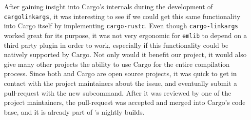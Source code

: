 After gaining insight into Cargo's internals during the development of \texttt{cargo\-linkargs}, it was interesting to see if we could get this same functionality into Cargo itself by implementing \texttt{cargo-rustc}.
Even though \texttt{cargo-linkargs} worked great for its purpose, it was not very ergonomic for \texttt{emlib} to depend on a third party plugin in order to work, especially if this functionality could be natively supported by Cargo.
Not only would it benefit our project, it would also give many other \rust projects the ability to use Cargo for the entire compilation process.
Since both \rust and Cargo are open source projects, it was quick to get in contact with the project maintainers about the issue, and eventually submit a pull-request with the new subcommand.
After it was reviewed by one of the project maintainers, the pull-request was accepted and merged into Cargo's code base, and it is already part of \rust's nightly builds.
